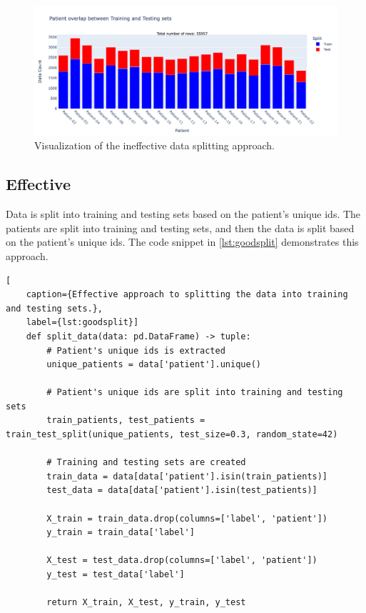                     \begin{figure}[H]
                        \centering
                        \includegraphics[width=1.0\textwidth]{../src/resources/bad_split.png}
                        \caption{
                            Visualization of the ineffective data splitting approach.
                        }
                        \label{fig:badsplit}
                    \end{figure}
        
                    \newpage

            \subsection{Effective} \label{sec:goodsplit}
            Data is split into training and testing sets based on the patient's unique ids. The patients are split into training and testing sets, and then the data is split based on the patient's unique ids.  The code snippet in \ref{lst:goodsplit} demonstrates this approach.

\begin{lstlisting}[
    caption={Effective approach to splitting the data into training and testing sets.}, 
    label={lst:goodsplit}]
    def split_data(data: pd.DataFrame) -> tuple:    
        # Patient's unique ids is extracted
        unique_patients = data['patient'].unique()

        # Patient's unique ids are split into training and testing sets
        train_patients, test_patients = train_test_split(unique_patients, test_size=0.3, random_state=42)

        # Training and testing sets are created
        train_data = data[data['patient'].isin(train_patients)]
        test_data = data[data['patient'].isin(test_patients)] 

        X_train = train_data.drop(columns=['label', 'patient'])
        y_train = train_data['label']

        X_test = test_data.drop(columns=['label', 'patient'])
        y_test = test_data['label']
        
        return X_train, X_test, y_train, y_test
\end{lstlisting}

